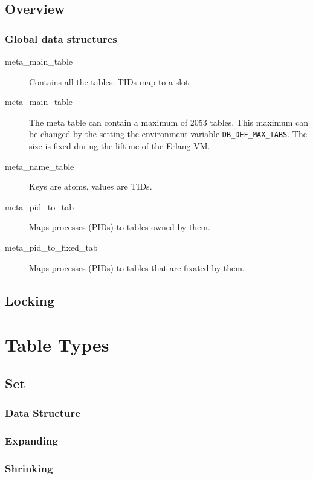 \documentclass[aps,pre,preprint,nofootinbib]{revtex4}
\begin{document}
\subsection{Overview} \label{sec:tables_overview}


\subsubsection{Global data structures}


\begin{description}
  \item[meta\_main\_table] Contains all the tables. TIDs map to a slot.
  \item[meta\_main\_table] The meta table can contain a maximum of 2053 tables. 
  This maximum can be changed by the setting the  environment variable \verb|DB_DEF_MAX_TABS|.
  The size is fixed during the liftime of the Erlang VM.
  \item[meta\_name\_table] Keys are atoms, values are TIDs.
  \item[meta\_pid\_to\_tab] Maps processes (PIDs) to tables owned by them.
  \item[meta\_pid\_to\_fixed\_tab] Maps processes (PIDs) to tables that are
    fixated by them.
\end{description}

\subsection{Locking} \label{sec:tables_locking}


\section{Table Types} \label{sec:table_types}

\subsection{Set}     %
\subsubsection{Data Structure}
\subsubsection{Expanding}
\subsubsection{Shrinking}
\end{document}

